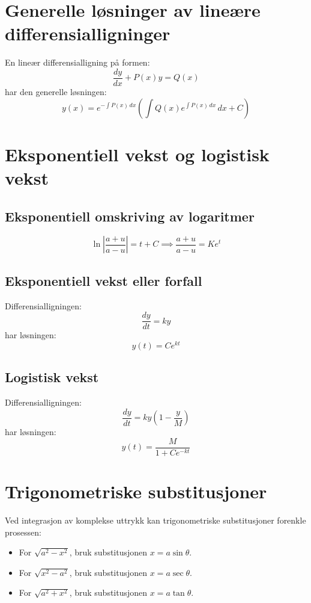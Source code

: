 \documentclass[a4paper,8pt,fleqn]{article}
\begin{document}
\begin{multicols}{3}
\section{Generelle løsninger av lineære differensialligninger}
En lineær differensialligning på formen:
\[
\frac{dy}{dx} + P(x)y = Q(x)
\]
har den generelle løsningen:
\[
y(x) = e^{-\int P(x) \, dx} \left(\int Q(x) e^{\int P(x) \, dx} \, dx + C\right)
\]

\section{Eksponentiell vekst og logistisk vekst}
\subsection{Eksponentiell omskriving av logaritmer}
\[
\ln\left|\frac{a + u}{a - u}\right| = t + C \implies \frac{a + u}{a - u} = K e^{t}
\]

\subsection{Eksponentiell vekst eller forfall}
Differensialligningen:
\[
\frac{dy}{dt} = ky
\]
har løsningen:
\[
y(t) = Ce^{kt}
\]

\subsection{Logistisk vekst}
Differensialligningen:
\[
\frac{dy}{dt} = ky\left(1 - \frac{y}{M}\right)
\]
har løsningen:
\[
y(t) = \frac{M}{1 + Ce^{-kt}}
\]

\section{Trigonometriske substitusjoner}
Ved integrasjon av komplekse uttrykk kan trigonometriske substitusjoner forenkle prosessen:
\begin{itemize}
    \item For \(\sqrt{a^2 - x^2}\), bruk substitusjonen \(x = a \sin\theta\).
    \item For \(\sqrt{x^2 - a^2}\), bruk substitusjonen \(x = a \sec\theta\).
    \item For \(\sqrt{a^2 + x^2}\), bruk substitusjonen \(x = a \tan\theta\).
\end{itemize}































\end{multicols}
\end{document}
